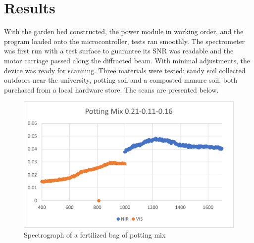 \documentclass[journal]{IEEEtran}
\begin{document}
\section{Results}
With the garden bed constructed, the power module in working order, and the program loaded onto the microcontroller, 
tests ran smoothly. The spectrometer was first run with a test surface to guarantee its SNR was readable and the 
motor carriage passed along the diffracted beam. With minimal adjustments, the device was ready for scanning. 
Three materials were tested: sandy soil collected outdoors near the university, potting soil and a composted 
manure soil, both purchased from a local hardware store. The scans are presented below.
\begin{figure}[H]
   \centering
   \label{fig:Data1}
   \includegraphics[width=\linewidth]{images/Data1.png}
   \caption{Spectrograph of a fertilized bag of potting mix}
\end{figure}
\end{document}
